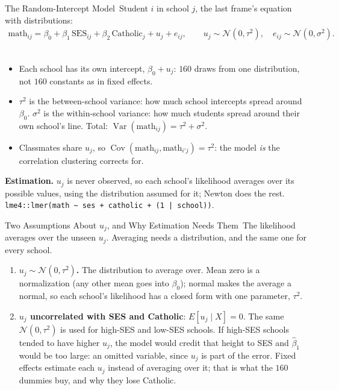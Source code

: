 \documentclass[aspectratio=169,11pt,xcolor=dvipsnames]{beamer}
\DeclareMathOperator{\Cov}{Cov}
\DeclareMathOperator{\Var}{Var}
\newcommand{\core}{\,\raisebox{0.6pt}{\textcolor{corestar}{$\bigstar$}}}
\begin{document}
\begin{frame}{The Random-Intercept Model\core}
Student $i$ in school $j$, the last frame's equation with distributions:
\begin{align*}
  \text{math}_{ij} = \beta_0 + \beta_1\,\text{SES}_{ij} + \beta_2\,\text{Catholic}_j + u_j + e_{ij},
  \qquad u_j \sim \mathcal N(0, \tau^2), \quad e_{ij} \sim \mathcal N(0, \sigma^2).
\end{align*} \\[-2pt]
\begin{itemize}\itemsep2pt
  \item Each school has its own intercept, $\beta_0 + u_j$: $160$ draws
        from one distribution, not $160$ constants as in fixed effects.
  \item \alert{$\tau^2$ is the between-school variance}: how much school
        intercepts spread around $\beta_0$. \alert{$\sigma^2$ is the
        within-school variance}: how much students spread around their own
        school's line. Total: $\Var(\text{math}_{ij}) = \tau^2 + \sigma^2$.
  \item Classmates share $u_j$, so $\Cov(\text{math}_{ij}, \text{math}_{i'j})
       = \tau^2$: the model \emph{is} the correlation clustering corrects for.
\end{itemize}
\vskip2pt
\textbf{Estimation.} $u_j$ is never observed, so each school's likelihood
averages over its possible values, using the distribution assumed for it;
Newton does the rest.
\texttt{lme4::lmer(math \~{} ses + catholic + (1 | school))}.
\end{frame}

\begin{frame}{Two Assumptions About $u_j$, and Why Estimation Needs Them\core}
The likelihood averages over the unseen $u_j$. Averaging needs a
distribution, and the same one for every school.
\begin{enumerate}\itemsep2pt
  \item \textbf{$u_j \sim \mathcal N(0, \tau^2)$.} The distribution to
        average over. Mean zero is a normalization (any other mean goes
        into $\beta_0$); normal makes the average a normal, so each
        school's likelihood has a closed form with one parameter, $\tau^2$.
  \item \textbf{$u_j$ uncorrelated with SES and Catholic}: $E[u_j \mid X]
       = 0$. The same $\mathcal N(0, \tau^2)$ is used for high-SES and
        low-SES schools. If high-SES schools tended to have higher $u_j$,
        the model would credit that height to SES and $\hat\beta_1$ would
        be too large: an omitted variable, since $u_j$ is part of the
        error. Fixed effects estimate each $u_j$ instead of averaging over
        it; that is what the $160$ dummies buy, and why they lose Catholic.
\end{enumerate}
\end{frame}
\end{document}
